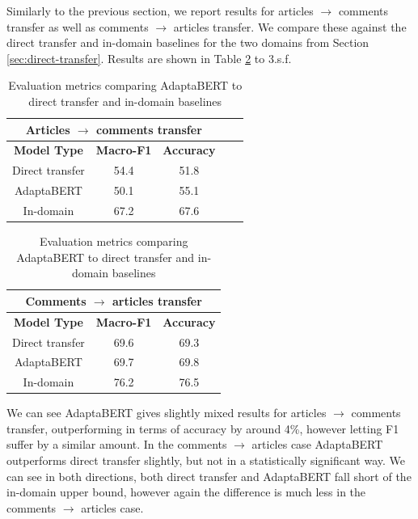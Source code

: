 Similarly to the previous section, we report results for articles $ \rightarrow $ comments transfer as well as comments $ \rightarrow $ articles transfer. We compare these against the direct transfer and in-domain baselines for the two domains from Section \ref{sec:direct-transfer}. Results are shown in Table \ref{tab:adaptabert-results} to 3.s.f.

\begin{table}[ht]
    \begin{center}
        \begin{tabular}{|c|c|c|c|c|}
            \hline
            \multicolumn{3}{|c|}{\textbf{Articles $ \rightarrow $ comments transfer}} \\
            \hline
            \textbf{Model Type} & \textbf{Macro-F1} & \textbf{Accuracy} \\
            \hline
            Direct transfer & 54.4 & 51.8  \\
            AdaptaBERT & 50.1 & 55.1 \\
            \hline
            In-domain & 67.2 & 67.6 \\
            \hline
        \end{tabular}
    \end{center} \vspace{10pt}
    \begin{center}
        \begin{tabular}{|c|c|c|}
            \hline
            \multicolumn{3}{|c|}{\textbf{Comments $ \rightarrow $ articles transfer}} \\
            \hline
            \textbf{Model Type} & \textbf{Macro-F1} & \textbf{Accuracy} \\
            \hline
            Direct transfer & 69.6 & 69.3  \\
            AdaptaBERT & 69.7 & 69.8 \\
            \hline
            In-domain & 76.2 & 76.5  \\
            \hline
        \end{tabular}
    \end{center}
    \caption{Evaluation metrics comparing AdaptaBERT to direct transfer and in-domain baselines}
    \label{tab:adaptabert-results}
\end{table}

We can see AdaptaBERT gives slightly mixed results for articles $ \rightarrow $ comments transfer, outperforming in terms of accuracy by around 4\%, however letting F1 suffer by a similar amount. In the comments $ \rightarrow $ articles case AdaptaBERT outperforms direct transfer slightly, but not in a statistically significant way. We can see in both directions, both direct transfer and AdaptaBERT fall short of the in-domain upper bound, however again the difference is much less in the comments $ \rightarrow $ articles case.

